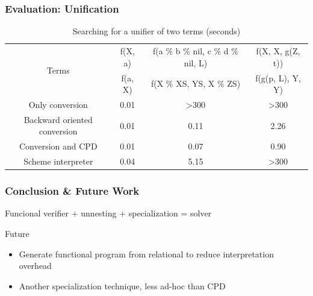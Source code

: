 \documentclass[xcolor=table]{beamer}
\begin{document}
\begin{frame}[fragile]
  \transwipe[direction=90]
  \frametitle{Evaluation: Unification}
\begin{table}
\tiny
\centering
\begin{tabular}{c|c|c|c}
\multirow{ 2}{*}{Terms} & 
f(X, a) & f(a \% b \% nil, c \% d \% nil, L) & f(X, X, g(Z, t))  \\
\cline{2-4} &
f(a, X) & f(X \% XS, YS, X \% ZS) & f(g(p, L), Y, Y)  \\
\hline\hline
Only conversion               & 0.01  &  >300 & >300 \\
\hline
Backward oriented conversion  & 0.01  &  0.11 & 2.26  \\
\hline
Conversion and CPD            & 0.01  &  0.07 & 0.90  \\
\hline

Scheme interpreter            & 0.04  & 5.15 & >300   \\
\end{tabular}
 \caption{Searching for a unifier of two terms (seconds)}
    \label{tab:uni}
\end{table}
\end{frame}

\begin{frame}[fragile]
  \transwipe[direction=90]
  \frametitle{Conclusion \& Future Work}
Funcional verifier + unnesting + specialization = solver
 
Future
 
\begin{itemize} 
  \item Generate functional program from relational to reduce interpretation overhead
  \item Another specialization technique, less ad-hoc than CPD

\end{itemize} 
\end{frame}
\end{document}

